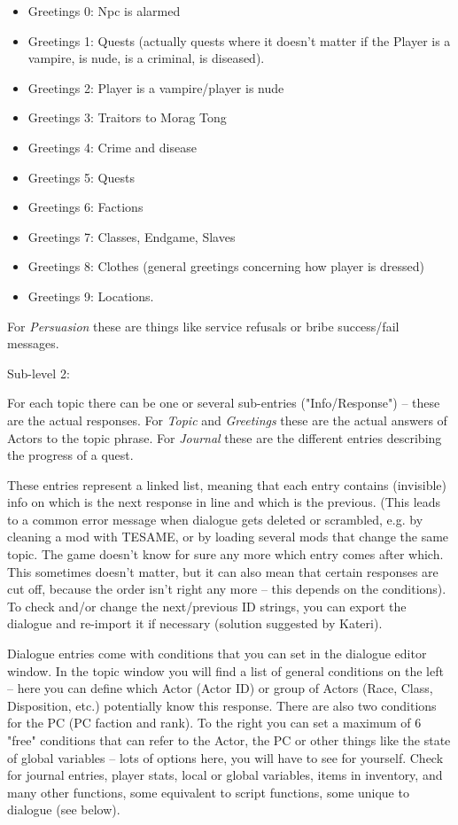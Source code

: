 \begin{itemize}
\item
  Greetings 0: Npc is alarmed
\item
  Greetings 1: Quests (actually quests where it doesn't matter if the
  Player is a vampire, is nude, is a criminal, is diseased).
\item
  Greetings 2: Player is a vampire/player is nude
\item
  Greetings 3: Traitors to Morag Tong
\item
  Greetings 4: Crime and disease
\item
  Greetings 5: Quests
\item
  Greetings 6: Factions
\item
  Greetings 7: Classes, Endgame, Slaves
\item
  Greetings 8: Clothes (general greetings concerning how player is
  dressed)
\item
  Greetings 9: Locations.
\end{itemize}

For \emph{Persuasion} these are things like service refusals or bribe
success/fail messages.

Sub-level 2:

For each topic there can be one or several sub-entries ("Info/Response")
-- these are the actual responses. For \emph{Topic} and \emph{Greetings}
these are the actual answers of Actors to the topic phrase. For
\emph{Journal} these are the different entries describing the progress
of a quest.

These entries represent a linked list, meaning that each entry contains
(invisible) info on which is the next response in line and which is the
previous. (This leads to a common error message when dialogue gets
deleted or scrambled, e.g. by cleaning a mod with TESAME, or by loading
several mods that change the same topic. The game doesn't know for sure
any more which entry comes after which. This sometimes doesn't matter,
but it can also mean that certain responses are cut off, because the
order isn't right any more -- this depends on the conditions). To check
and/or change the next/previous ID strings, you can export the dialogue
and re-import it if necessary (solution suggested by Kateri).

Dialogue entries come with conditions that you can set in the dialogue
editor window. In the topic window you will find a list of general
conditions on the left -- here you can define which Actor (Actor ID) or
group of Actors (Race, Class, Disposition, etc.) potentially know this
response. There are also two conditions for the PC (PC faction and
rank). To the right you can set a maximum of 6 "free" conditions that
can refer to the Actor, the PC or other things like the state of global
variables -- lots of options here, you will have to see for yourself.
Check for journal entries, player stats, local or global variables,
items in inventory, and many other functions, some equivalent to script
functions, some unique to dialogue (see below).

